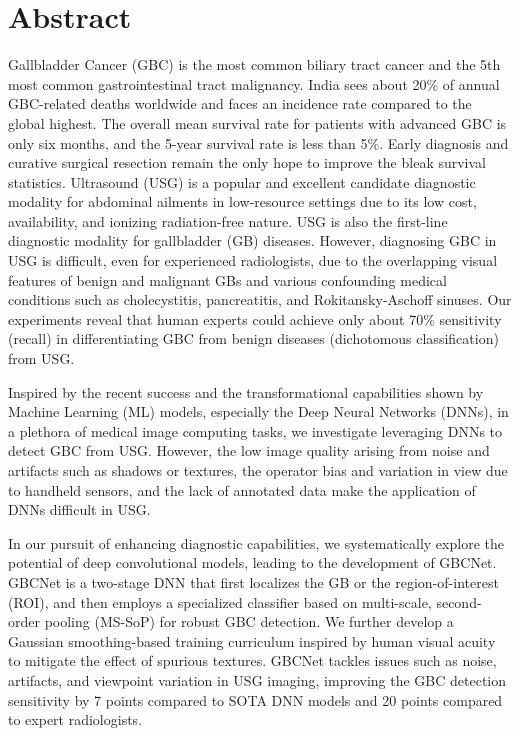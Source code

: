 \onehalfspacing
\pagestyle{plain}
\chapter*{Abstract}

Gallbladder Cancer (GBC) is the most common biliary tract cancer and the 5th most common gastrointestinal tract malignancy. India sees about 20\% of annual GBC-related deaths worldwide and faces an incidence rate compared to the global highest. The overall mean survival rate for patients with advanced GBC is only six months, and the 5-year survival rate is less than 5\%. Early diagnosis and curative surgical resection remain the only hope to improve the bleak survival statistics. Ultrasound (USG) is a popular and excellent candidate diagnostic modality for abdominal ailments in low-resource settings due to its low cost, availability, and ionizing radiation-free nature. USG is also the first-line diagnostic modality for gallbladder (GB) diseases. However, diagnosing GBC in USG is difficult, even for experienced radiologists, due to the overlapping visual features of benign and malignant GBs and various confounding medical conditions such as cholecystitis, pancreatitis, and Rokitansky-Aschoff sinuses. Our experiments reveal that human experts could achieve only about 70\% sensitivity (recall) in differentiating GBC from benign diseases (dichotomous classification) from USG. 

\par Inspired by the recent success and the transformational capabilities shown by Machine Learning (ML) models, especially the Deep Neural Networks (DNNs), in a plethora of medical image computing tasks, we investigate leveraging DNNs to detect GBC from USG. However, the low image quality arising from noise and artifacts such as shadows or textures, the operator bias and variation in view due to handheld sensors, and the lack of annotated data make the application of DNNs difficult in USG. 

\par In our pursuit of enhancing diagnostic capabilities, we systematically explore the potential of deep convolutional models, leading to the development of GBCNet. GBCNet is a two-stage DNN that first localizes the GB or the region-of-interest (ROI), and then employs a specialized classifier based on multi-scale, second-order pooling (MS-SoP) for robust GBC detection. We further develop a Gaussian smoothing-based training curriculum inspired by human visual acuity to mitigate the effect of spurious textures. GBCNet tackles issues such as noise, artifacts, and viewpoint variation in USG imaging, improving the GBC detection sensitivity by 7 points compared to SOTA DNN models and 20 points compared to expert radiologists. 

